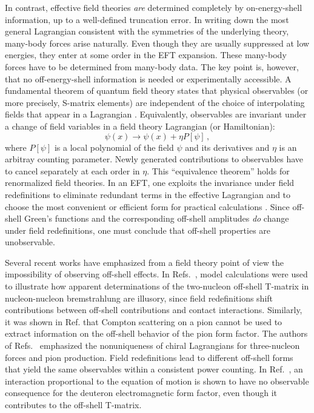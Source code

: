 \documentclass[aps,rmp,nofootinbib,twocolumn,floatfix]{revtex4}
\newcommand{\beq}{\begin{equation}}
\newcommand{\eeq}{\end{equation}}
\begin{document}
In contrast, effective field theories {\em are\/} determined
completely by on-energy-shell information, up to a well-defined
truncation error. In writing down the most general Lagrangian
consistent with the symmetries of the underlying theory,
many-body forces arise naturally. Even though they are
usually suppressed at low energies, they enter at some order
in the EFT expansion. These many-body forces have to be determined
from many-body data. The key point is, however, that no
off-energy-shell information is needed or experimentally accessible.
A fundamental theorem of quantum field theory states that
physical observables (or more precisely, S-matrix elements) are
independent of the choice of interpolating fields that appear in
a Lagrangian \cite{Haag58,COLEMAN69}.
Equivalently, observables are invariant
under a change
of field variables in a field theory Lagrangian (or Hamiltonian):
\beq
\psi(x) \to \psi(x) + \eta P[\psi]\,,
\eeq
where $P[\psi]$ is a local polynomial of the field $\psi$ and its derivatives
and $\eta$ is an arbitray counting parameter.
Newly generated contributions to observables have to cancel separately at
each order in $\eta$. 
This ``equivalence theorem'' holds for renormalized field theories.
In an EFT, one exploits the invariance under field redefinitions
to eliminate redundant terms in the effective Lagrangian and to choose
the most convenient or efficient form for practical
calculations \cite{POLITZER80,GEORGI91,KILIAN94,SCHERER95a,ARZT95}.
Since off-shell Green's functions and the corresponding off-shell amplitudes
{\it do\/} change under field redefinitions, one must conclude that off-shell
properties are unobservable.

Several recent works have emphasized from a field theory
point of view the impossibility of observing off-shell effects.
In Refs.~\cite{FEARING98,FEARING99},
model calculations were used to illustrate how apparent determinations of
the two-nucleon off-shell T-matrix in
nucleon-nucleon bremstrahlung are illusory, since field redefinitions
shift contributions between off-shell contributions and contact interactions.
Similarly, it was shown in Ref. \cite{SCHERER95b} that Compton scattering
on a pion cannot be used to extract information on the off-shell
behavior of the pion form factor.
The authors of Refs.~\cite{FHK99,CFM96} emphasized the nonuniqueness
of chiral Lagrangians for three-nucleon forces and pion production.
Field redefinitions lead to different off-shell forms that yield the same
observables within a consistent power counting.
In Ref.~\cite{KSW99}, an interaction proportional to the equation of
motion is shown to have no observable consequence
for the deuteron electromagnetic form factor, even though it contributes
to the off-shell T-matrix.
\end{document}
